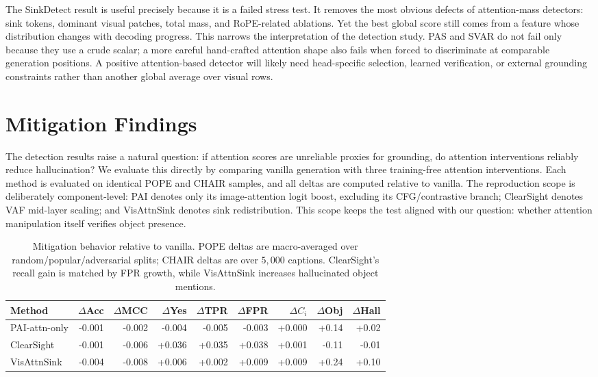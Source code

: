 \documentclass[letterpaper]{article} \usepackage[submission]{aaai2027}  \usepackage[hyphens]{url}  \usepackage{graphicx} \urlstyle{rm} \def\UrlFont{\rm}  \usepackage{natbib}  \usepackage{caption} \frenchspacing
\begin{document}
The SinkDetect result is useful precisely because it is a failed stress test. It removes the most obvious defects of attention-mass detectors: sink tokens, dominant visual patches, total mass, and RoPE-related ablations. Yet the best global score still comes from a feature whose distribution changes with decoding progress. This narrows the interpretation of the detection study. PAS and SVAR do not fail only because they use a crude scalar; a more careful hand-crafted attention shape also fails when forced to discriminate at comparable generation positions. A positive attention-based detector will likely need head-specific selection, learned verification, or external grounding constraints rather than another global average over visual rows.
 \section{Mitigation Findings}
\label{sec:mitigation}

The detection results raise a natural question: if attention scores are unreliable proxies for grounding, do attention interventions reliably reduce hallucination? We evaluate this directly by comparing vanilla generation with three training-free attention interventions. Each method is evaluated on identical POPE and CHAIR samples, and all deltas are computed relative to vanilla.
The reproduction scope is deliberately component-level: PAI denotes only its image-attention logit boost, excluding its CFG/contrastive branch; ClearSight denotes VAF mid-layer scaling; and VisAttnSink denotes sink redistribution. This scope keeps the test aligned with our question: whether attention manipulation itself verifies object presence.

\begin{table}[t]
\centering
\small
\setlength{\tabcolsep}{4.2pt}
\begin{tabular}{lrrrrrrrr}
\toprule
Method & $\Delta$Acc & $\Delta$MCC & $\Delta$Yes & $\Delta$TPR & $\Delta$FPR & $\Delta C_i$ & $\Delta$Obj & $\Delta$Hall \\
\midrule
PAI-attn-only & -0.001 & -0.002 & -0.004 & -0.005 & -0.003 & +0.000 & +0.14 & +0.02 \\
ClearSight    & -0.001 & -0.006 & +0.036 & +0.035 & +0.038 & +0.001 & -0.11 & -0.01 \\
VisAttnSink   & -0.004 & -0.008 & +0.006 & +0.002 & +0.009 & +0.009 & +0.24 & +0.10 \\
\bottomrule
\end{tabular}
\caption{Mitigation behavior relative to vanilla. POPE deltas are macro-averaged over random/popular/adversarial splits; CHAIR deltas are over $5{,}000$ captions. ClearSight's recall gain is matched by FPR growth, while VisAttnSink increases hallucinated object mentions.}
\label{tab:pope-mitigation}
\end{table}
 
\end{document}
